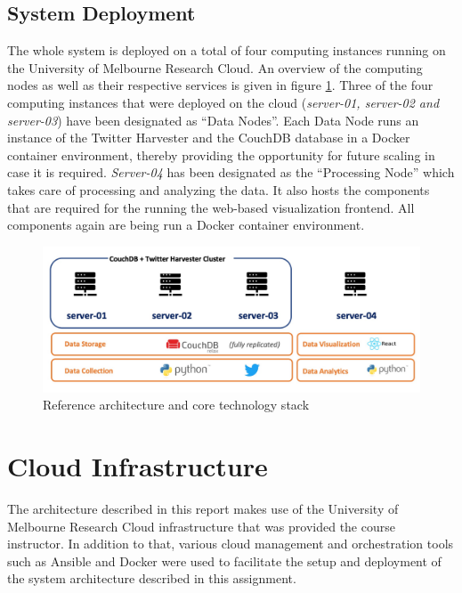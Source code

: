 \documentclass[11pt, oneside]{article}
\begin{document}
\subsection{System Deployment}
The whole system is deployed on a total of four computing instances running on the University of Melbourne Research Cloud. An overview of the computing nodes as well as their respective services is given in figure \ref{fig:system_deployment}.
\newline
Three of the four computing instances that were deployed on the cloud (\emph{server-01, server-02 and server-03}) have been designated as \enquote{Data Nodes}. Each Data Node runs an instance of the Twitter Harvester and the CouchDB database in a Docker container environment, thereby providing the opportunity for future scaling in case it is required.
\newline
\emph{Server-04} has been designated as the \enquote{Processing Node} which takes care of processing and analyzing the data. It also hosts the components that are required for the running the web-based visualization frontend. All components again are being run a Docker container environment.
\begin{figure}
  \includegraphics[width=\linewidth]{figures/fig_system_deployment.png}
  \caption{Reference architecture and core technology stack}
  \label{fig:system_deployment}
\end{figure}

\section{Cloud Infrastructure}
\label{sec:cloud_infrastructure}
The architecture described in this report makes use of the University of Melbourne Research Cloud infrastructure that was provided the course instructor. In addition to that, various cloud management and orchestration tools such as Ansible and Docker were used to facilitate the setup and deployment of the system architecture described in this assignment.
\end{document}
